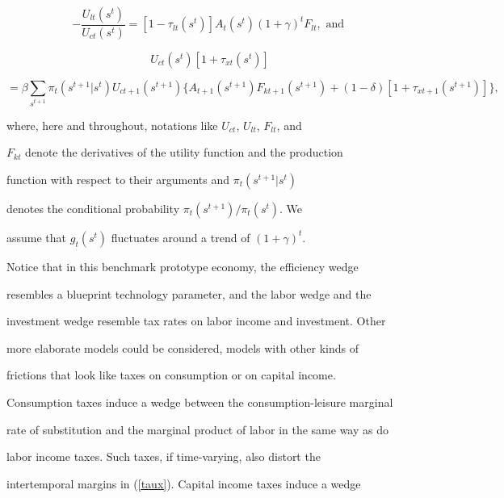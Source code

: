 \documentclass[fleqn,leqno,11pt]{article}
\begin{document}
\begin{equation}

-\frac{U_{lt}(s^{t})}{U_{ct}(s^{t})}=[1-\tau

_{lt}(s^{t})]A_{t}(s^{t})(1+\gamma )^{t}F_{lt},\text{ and }  \label{taun}

\end{equation}%

\begin{equation}

U_{ct}(s^{t})[1+\tau _{xt}(s^{t})]  \label{taux}

\end{equation}%

\[

=\beta \sum_{s^{t+1}}\pi

_{t}(s^{t+1}|s^{t})U_{ct+1}(s^{t+1})\{A_{t+1}(s^{t+1})F_{kt+1}(s^{t+1})+(1-%

\delta )[1+\tau _{xt+1}(s^{t+1})]\}, 

\]%

where, here and throughout, notations like $U_{ct}$, $U_{lt}$, $F_{lt}$, and 

$F_{kt}$ denote the derivatives of the utility function and the production

function with respect to their arguments and $\pi _{t}(s^{t+1}|s^{t})$

denotes the conditional probability $\pi _{t}(s^{t+1})/\pi _{t}(s^{t})$. We

assume that $g_{t}(s^{t})$ fluctuates around a trend of $(1+\gamma )^{t}.$



Notice that in this benchmark prototype economy, the efficiency wedge

resembles a blueprint technology parameter, and the labor wedge and the

investment wedge resemble tax rates on labor income and investment. Other

more elaborate models could be considered, models with other kinds of

frictions that look like taxes on consumption or on capital income.

Consumption taxes induce a wedge between the consumption-leisure marginal

rate of substitution and the marginal product of labor in the same way as do

labor income taxes. Such taxes, if time-varying, also distort the

intertemporal margins in (\ref{taux}). Capital income taxes induce a wedge
\end{document}
